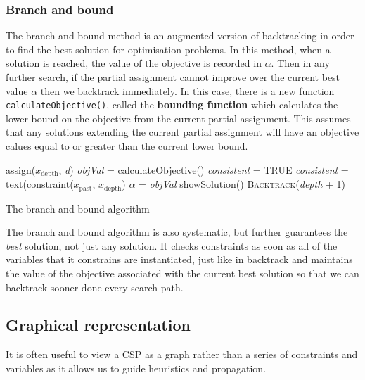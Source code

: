 \documentclass[CS4402-Notes.tex]{subfiles}
\begin{document}
\subsubsection{Branch and bound}
The branch and bound method is an augmented version of backtracking in order to find the best solution for optimisation problems. In this method, when a solution is reached, the value of the objective is recorded in $\alpha$. Then in any further search, if the partial assignment cannot improve over the current best value $\alpha$ then we backtrack immediately.
\n
In this case, there is a new function \texttt{calculateObjective()}, called the \textbf{bounding function} which calculates the lower bound on the objective from the current partial assignment. This assumes that any solutions extending the current partial assignment will have an objective calues equal to or greater than the current lower bound.
\begin{algorithm}[H]
\begin{algorithmic}[1]
\State assign($x_{\text{depth}}$, \textit{d})
\State \textit{objVal} = calculateObjective()
\State \textit{consistent} = TRUE
    \State \textit{consistent} = text(constraint($x_{\text{past}}$, $x_{\text{depth}}$)
  \EndFor
      \State $\alpha$ = \textit{objVal}
      \State showSolution()
    \Else
      \State \textsc{Backtrack}(\textit{depth} + 1)
    \EndIf
  \EndIf
\EndIf
\EndFor
\EndProcedure
\end{algorithmic}
\caption{The branch and bound algorithm}
\end{algorithm}
The branch and bound algorithm is also systematic, but further guarantees the \textit{best} solution, not just any solution. It checks constraints as soon as all of the variables that it constrains are instantiated, just like in backtrack and maintains the value of the objective associated with the current best solution so that we can backtrack sooner done every search path.

\subsection{Graphical representation}
It is often useful to view a CSP as a graph rather than a series of constraints and variables as it allows us to guide heuristics and propagation.
\end{document}
